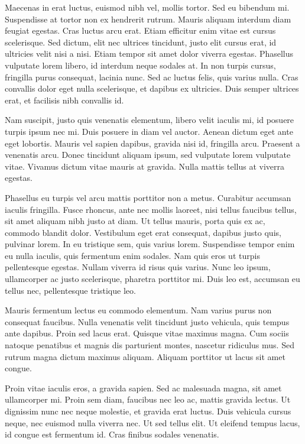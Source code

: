 Maecenas in erat luctus, euismod nibh vel, mollis tortor. Sed eu bibendum mi. Suspendisse at tortor non ex hendrerit rutrum. Mauris aliquam interdum diam feugiat egestas. Cras luctus arcu erat. Etiam efficitur enim vitae est cursus scelerisque. Sed dictum, elit nec ultrices tincidunt, justo elit cursus erat, id ultricies velit nisi a nisi. Etiam tempor sit amet dolor viverra egestas. Phasellus vulputate lorem libero, id interdum neque sodales at. In non turpis cursus, fringilla purus consequat, lacinia nunc. Sed ac luctus felis, quis varius nulla. Cras convallis dolor eget nulla scelerisque, et dapibus ex ultricies. Duis semper ultrices erat, et facilisis nibh convallis id.

Nam suscipit, justo quis venenatis elementum, libero velit iaculis mi, id posuere turpis ipsum nec mi. Duis posuere in diam vel auctor. Aenean dictum eget ante eget lobortis. Mauris vel sapien dapibus, gravida nisi id, fringilla arcu. Praesent a venenatis arcu. Donec tincidunt aliquam ipsum, sed vulputate lorem vulputate vitae. Vivamus dictum vitae mauris at gravida. Nulla mattis tellus at viverra egestas.

Phasellus eu turpis vel arcu mattis porttitor non a metus. Curabitur accumsan iaculis fringilla. Fusce rhoncus, ante nec mollis laoreet, nisi tellus faucibus tellus, sit amet aliquam nibh justo at diam. Ut tellus mauris, porta quis ex ac, commodo blandit dolor. Vestibulum eget erat consequat, dapibus justo quis, pulvinar lorem. In eu tristique sem, quis varius lorem. Suspendisse tempor enim eu nulla iaculis, quis fermentum enim sodales. Nam quis eros ut turpis pellentesque egestas. Nullam viverra id risus quis varius. Nunc leo ipsum, ullamcorper ac justo scelerisque, pharetra porttitor mi. Duis leo est, accumsan eu tellus nec, pellentesque tristique leo.

Mauris fermentum lectus eu commodo elementum. Nam varius purus non consequat faucibus. Nulla venenatis velit tincidunt justo vehicula, quis tempus ante dapibus. Proin sed lacus erat. Quisque vitae maximus magna. Cum sociis natoque penatibus et magnis dis parturient montes, nascetur ridiculus mus. Sed rutrum magna dictum maximus aliquam. Aliquam porttitor ut lacus sit amet congue.

Proin vitae iaculis eros, a gravida sapien. Sed ac malesuada magna, sit amet ullamcorper mi. Proin sem diam, faucibus nec leo ac, mattis gravida lectus. Ut dignissim nunc nec neque molestie, et gravida erat luctus. Duis vehicula cursus neque, nec euismod nulla viverra nec. Ut sed tellus elit. Ut eleifend tempus lacus, id congue est fermentum id. Cras finibus sodales venenatis.

